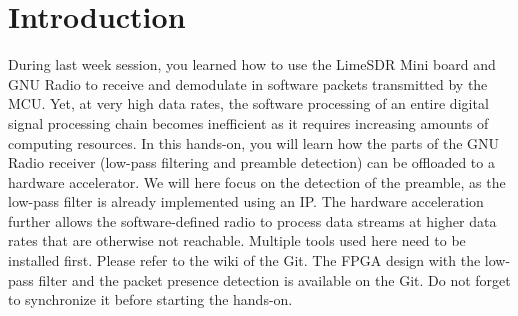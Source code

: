 \section*{Introduction}

During last week session, you learned how to use the LimeSDR Mini board and GNU Radio to receive and demodulate in software packets transmitted by the MCU. Yet, at very high data rates, the software processing of an entire digital signal processing chain becomes inefficient as it requires increasing amounts of computing resources. In this hands-on, you will learn how the parts of the GNU Radio receiver (low-pass filtering and preamble detection) can be offloaded to a hardware accelerator. We will here focus on the detection of the preamble, as the low-pass filter is already implemented using an IP. The hardware acceleration further allows the software-defined radio to process data streams at higher data rates that are otherwise not reachable. Multiple tools used here need to be installed first. Please refer to the wiki of the Git. The FPGA design with the low-pass filter and the packet presence detection is available on the Git. Do not forget to synchronize it before starting the hands-on.
